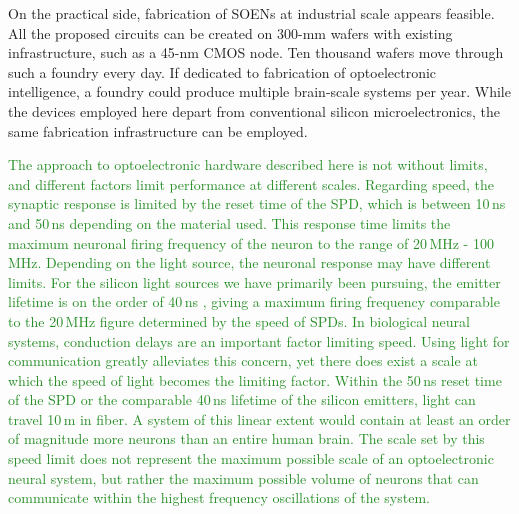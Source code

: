 \documentclass[twocolumn]{article}
\begin{document}
On the practical side, fabrication of SOENs at industrial scale appears feasible. All the proposed circuits can be created on 300-mm wafers with existing infrastructure, such as a 45-nm CMOS node. Ten thousand wafers move through such a foundry every day. If dedicated to fabrication of optoelectronic intelligence, a foundry could produce multiple brain-scale systems per year. While the devices employed here depart from conventional silicon microelectronics, the same fabrication infrastructure can be employed. 

\textcolor{ForestGreen}{The approach to optoelectronic hardware described here is not without limits, and different factors limit performance at different scales. Regarding speed, the synaptic response is limited by the reset time of the SPD, which is between 10\,ns and 50\,ns depending on the material used. This response time limits the maximum neuronal firing frequency of the neuron to the range of 20\,MHz - 100\,MHz. Depending on the light source, the neuronal response may have different limits. For the silicon light sources we have primarily been pursuing, the emitter lifetime is on the order of 40\,ns \cite{buta2020}, giving a maximum firing frequency comparable to the 20\,MHz figure determined by the speed of SPDs. In biological neural systems, conduction delays are an important factor limiting speed. Using light for communication greatly alleviates this concern, yet there does exist a scale at which the speed of light becomes the limiting factor. Within the 50\,ns reset time of the SPD or the comparable 40\,ns lifetime of the silicon emitters, light can travel 10\,m in fiber. A system of this linear extent would contain at least an order of magnitude more neurons than an entire human brain. The scale set by this speed limit does not represent the maximum possible scale of an optoelectronic neural system, but rather the maximum possible volume of neurons that can communicate within the highest frequency oscillations of the system.}
\end{document}
